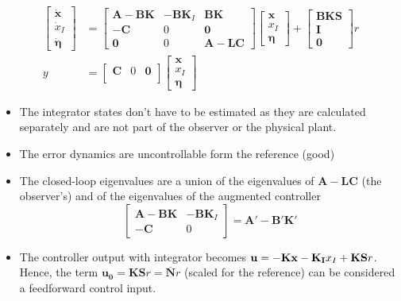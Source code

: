 \begin{align*}
    \begin{bmatrix}
        \dot{\mathbf{x}} \\
        \dot{x}_I        \\
        \dot{\bm{\eta}}
    \end{bmatrix}
      & =
    \begin{bmatrix}
        \mathbf{A-BK} & \mathbf{-BK}_I & \mathbf{BK}   \\
        \mathbf{-C}   & 0              & \mathbf{0}    \\
        \mathbf{0}    & 0              & \mathbf{A-LC}
    \end{bmatrix}
    \begin{bmatrix}
        \mathbf{x} \\
        x_I        \\
        \bm{\eta}
    \end{bmatrix}
    +
    \begin{bmatrix}
        \mathbf{BKS} \\
        \mathbf{I}   \\
        \mathbf{0}
    \end{bmatrix}
    r                                 \\
    y & = \begin{bmatrix}
              \mathbf{C} & 0 & \mathbf{0} \\
          \end{bmatrix}
    \begin{bmatrix}
        \mathbf{x} \\
        x_I        \\
        \bm{\eta}
    \end{bmatrix}
\end{align*}

\newpar{}
\begin{itemize}
    \item The integrator states don't have to be estimated as they are calculated separately and are not part of the observer or the physical plant.
    \item The error dynamics are uncontrollable form the reference (good)
    \item The closed-loop eigenvalues are a union of the eigenvalues of $\mathbf{A-LC}$ (the observer's) and of the eigenvalues of the augmented controller \begin{equation*}
              \begin{bmatrix}
                  \mathbf{A-BK} & \mathbf{-BK}_I \\
                  \mathbf{-C}   & 0
              \end{bmatrix}
              = \mathbf{A'-B'K'}
          \end{equation*}
    \item The controller output with integrator becomes $\newline \mathbf{u}=-\mathbf{Kx}-\mathbf{K_{I}}x_{I}+\mathbf{KS}r$. Hence, the term $\mathbf{u_0}=\mathbf{KS}r=\mathbf{\overline{N}}r$ (scaled for the reference) can be considered a feedforward control input.
\end{itemize}

